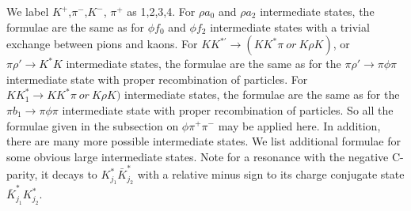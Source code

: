 We label $K^+$,$\pi^-$,$K^-$, $\pi^+$ as 1,2,3,4. For $\rho a_0$
and $\rho a_2$ intermediate states, the formulae are the same as
for $\phi f_0$ and $\phi f_2$ intermediate states with a trivial
exchange between pions and kaons. For $KK^{*'}\to(KK^*\pi~or~K\rho
K)$, or $\pi\rho'\to K^*K$ intermediate states, the formulae are
the same as for the $\pi\rho'\to\pi\phi\pi$ intermediate state
with proper recombination of particles. For $KK^*_1\to
KK^*\pi~or~K\rho K)$ intermediate states, the formulae are the
same as for the $\pi b_1\to\pi\phi\pi$ intermediate state with
proper recombination of particles. So all the formulae given in
the subsection on $\phi\pi^+\pi^-$ may be applied here. In
addition, there are many more possible intermediate states. We
list additional formulae for some obvious large intermediate
states. Note for a resonance with the negative C-parity, it decays
to $K^*_{j_1}\bar K^*_{j_2}$ with a relative minus sign to its
charge conjugate  state $\bar K^*_{j_1}K^*_{j_2}$.
